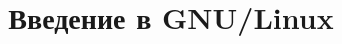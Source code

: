 

\title{Введение в GNU/Linux}










\frame{
	\frametitle{}
	\titlepage
	\vspace{-0.5cm}
	\begin{center}
	\end{center}
}
\frame{
	\tableofcontents
}

